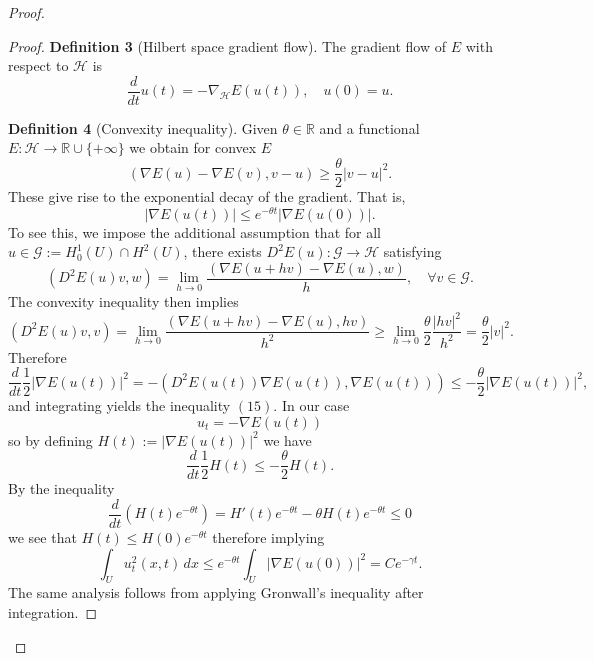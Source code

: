 \documentclass{article}
\begin{document}
\begin{flushleft}
\begin{proof}
\begin{proof}
\textbf{Definition 3} (Hilbert space gradient flow). The gradient flow of $E$ with respect to $\mathcal{H}$ is
$$\frac{d}{dt}u(t)=-\nabla_\mathcal{H}E(u(t)), \quad u(0)=u.$$

\textbf{Definition 4} (Convexity inequality). Given $\theta\in\mathbb R$ and a functional $E:\mathcal{H} \to \mathbb R \cup \{+\infty\}$ we obtain for convex $E$
$$(\nabla E(u) - \nabla E(v), v - u)\geq \frac{\theta}{2}|v - u |^2.$$
These give rise to the exponential decay of the gradient. That is, 
\begin{equation}|\nabla E(u(t))|\leq e^{-\theta t}|\nabla E(u(0))|.\end{equation}
To see this, we impose the additional assumption that for all $u\in\mathcal{G}:=H_0^1(U)\cap H^2(U)$, there exists $D^2 E(u):\mathcal{G}\to\mathcal{H}$ satisfying 
$$(D^2 E(u)v,w)=\lim_{h\to 0}\frac{(\nabla E(u+hv)-\nabla E(u),w)}{h},\quad \forall v\in\mathcal{G}.$$
The convexity inequality then implies
$$(D^2 E(u)v,v)=\lim_{h\to 0}\frac{(\nabla E(u+hv)-\nabla E(u),hv)}{h^2}\geq
\lim_{h\to 0}\frac{\theta}{2}\frac{|hv|^2}{h^2}=\frac{\theta}{2}|v|^2.
$$
Therefore
$$\frac{d}{dt}\frac{1}{2}|\nabla E(u(t))|^2=-(D^2E(u(t))\nabla E(u(t)),\nabla E(u(t)))\leq -\frac{\theta}{2}|\nabla E(u(t))|^2,$$
and integrating yields the inequality $(15)$. In our case
$$u_t = -\nabla E(u(t))$$
so by defining $H(t):=|\nabla E(u(t))|^2$ we have 
$$\frac{d}{dt}\frac{1}{2}H(t) \leq - \frac{\theta}{2} H(t).$$
By the inequality 
$$\frac{d}{dt}\left(H(t)e^{-\theta t}\right) = H'(t)e^{-\theta t} - \theta H(t) e^{-\theta t} \leq 0$$
we see that $H(t) \leq H(0)e^{-\theta t}$ therefore implying
$$\int_U u_t^2(x,t)\,dx \leq e^{-\theta t}\int_U |\nabla E(u(0))|^2 = Ce^{-\gamma t}.$$
The same analysis follows from applying Gronwall's inequality after integration.


\end{proof}
\end{proof}
\end{flushleft}
\end{document}
